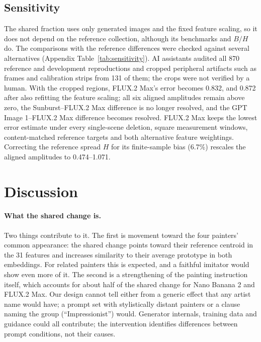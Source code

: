 \documentclass[10pt]{article}
\begin{document}
\subsection{Sensitivity}\label{sec:sensitivity}

The shared fraction uses only generated images and the fixed feature scaling, so it does not
depend on the reference collection, although its benchmarks and $B/H$ do. The comparisons with
the reference differences were checked against several alternatives (Appendix
Table~\ref{tab:sensitivity}). AI assistants audited all 870 reference and development
reproductions and cropped peripheral artifacts such as frames and calibration strips from 131
of them; the crops were not verified by a human. With the cropped regions, FLUX.2 Max's error
becomes 0.832, and 0.872 after also refitting the feature scaling; all six aligned amplitudes
remain above zero, the Sunburst--FLUX.2 Max difference is no longer resolved, and the GPT
Image 1--FLUX.2 Max difference becomes resolved. FLUX.2 Max keeps the lowest error estimate
under every single-scene deletion, square measurement windows, content-matched reference
targets and both alternative feature weightings. Correcting the reference spread $H$ for its
finite-sample bias (6.7\%) rescales the aligned amplitudes to 0.474--1.071.

\section{Discussion}\label{sec:discussion}

\paragraph{What the shared change is.}
Two things contribute to it. The first is movement toward the four painters' common
appearance: the shared change points toward their reference centroid in the 31 features and
increases similarity to their average prototype in both embeddings. For related painters this
is expected, and a faithful imitator would show even more of it. The second is a
strengthening of the painting instruction itself, which accounts for about half of the shared
change for Nano Banana 2 and FLUX.2 Max. Our design cannot tell either from a generic effect
that any artist name would have; a prompt set with stylistically distant painters or a clause
naming the group (``Impressionist'') would. Generator internals, training data and guidance
could all contribute; the intervention identifies differences between prompt conditions, not
their causes.
\end{document}
